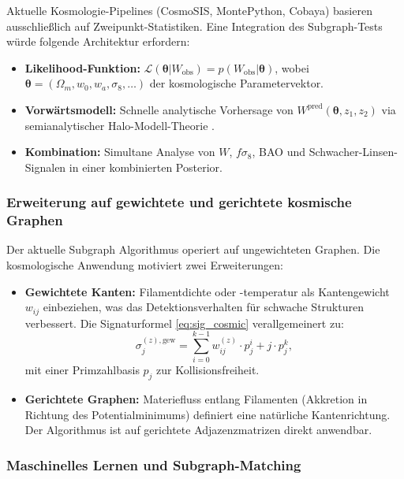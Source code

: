 ﻿\documentclass[a4paper,12pt]{article}
\theoremstyle{definition}
\theoremstyle{remark}
\begin{document}
Aktuelle Kosmologie-Pipelines (CosmoSIS, MontePython, Cobaya) basieren
ausschließlich auf Zweipunkt-Statistiken. Eine Integration des Subgraph-Tests
würde folgende Architektur erfordern:

\begin{itemize}
  \item \textbf{Likelihood-Funktion:} $\mathcal{L}(\boldsymbol\theta | W_\mathrm{obs})
    = p(W_\mathrm{obs} | \boldsymbol\theta)$, wobei $\boldsymbol\theta =
    (\Omega_m, w_0, w_a, \sigma_8, \ldots)$ der kosmologische Parametervektor.
  \item \textbf{Vorwärtsmodell:} Schnelle analytische Vorhersage von
    $W^\mathrm{pred}(\boldsymbol\theta, z_1, z_2)$ via semianalytischer
    Halo-Modell-Theorie \cite{peebles1993}.
  \item \textbf{Kombination:} Simultane Analyse von $W$, $f\sigma_8$, BAO
    und Schwacher-Linsen-Signalen in einer kombinierten Posterior.
\end{itemize}

\subsubsection*{Erweiterung auf gewichtete und gerichtete kosmische Graphen}

Der aktuelle Subgraph Algorithmus \cite{eppsubgraph2026} operiert auf
ungewichteten Graphen. Die kosmologische Anwendung motiviert zwei Erweiterungen:

\begin{itemize}
  \item \textbf{Gewichtete Kanten:} Filamentdichte oder -temperatur als
    Kantengewicht $w_{ij}$ einbeziehen, was das Detektionsverhalten für
    schwache Strukturen verbessert. Die Signaturformel
    \eqref{eq:sig_cosmic} verallgemeinert zu:
    \[
      \sigma_j^{(z),\text{gew}} = \sum_{i=0}^{k-1} w_{ij}^{(z)} \cdot p_j^i
      + j \cdot p_j^k,
    \]
    mit einer Primzahlbasis $p_j$ zur Kollisionsfreiheit.
  \item \textbf{Gerichtete Graphen:} Materiefluss entlang Filamenten
    (Akkretion in Richtung des Potentialminimums) definiert eine natürliche
    Kantenrichtung. Der Algorithmus ist auf gerichtete Adjazenzmatrizen
    direkt anwendbar.
\end{itemize}

\subsubsection*{Maschinelles Lernen und Subgraph-Matching}
\end{document}
